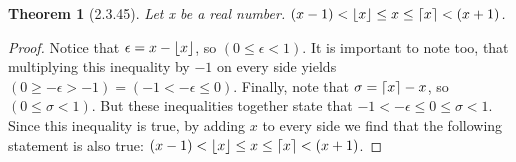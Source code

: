 \documentclass[a4paper, 12pt]{article}
\theoremstyle{plain}
\newtheorem*{theorem*}{Theorem}
\DeclarePairedDelimiter{\floor}{\lfloor}{\rfloor}
\DeclarePairedDelimiter{\ceil}{\lceil}{\rceil}
\begin{document}
	
	\begin{theorem*}[2.3.45]
		Let x be a real number. \newline $(x - 1) < \floor{x} \le x \le \ceil{x} < (x + 1)$.
	\end{theorem*}
	
	\begin{proof}
		Notice that $\epsilon = x - \floor{x}$, so $(0 \le \epsilon < 1)$. It is important to note too, that multiplying this inequality by $-1$ on every side yields $(0 \ge -\epsilon > -1) = (-1 < -\epsilon \le 0)$. Finally, note that $\sigma = \ceil{x} - x$, so $(0 \le \sigma < 1)$. But these inequalities together state that $-1 < -\epsilon \le 0 \le \sigma < 1$. Since this inequality is true, by adding $x$ to every side we find that the following statement is also true: $(x - 1) < \floor{x} \le x \le \ceil{x} < (x + 1)$.
		
	\end{proof}
\end{document}
